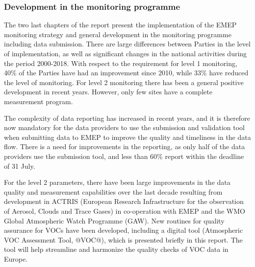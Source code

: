 \subsubsection*{Development in the monitoring programme} 
The two last chapters of the report present the implementation of the EMEP monitoring strategy and general development in the monitoring programme including data submission. There are large differences between Parties in the level of implementation, as well as significant changes in the national activities during the period 2000-2018. With respect to the requirement for level 1 monitoring, 40\% of the Parties have had an improvement since 2010, while 33\% have reduced the level of monitoring. For level 2 monitoring there has been a general positive development in recent years. However, only few sites have a complete measurement program.

The complexity of data reporting has increased in recent years, and it is therefore now mandatory for the data providers to use the submission and validation tool when submitting data to EMEP to improve the quality and timeliness in the data flow. 
There is a need for improvements in the reporting, as only half of the data 
providers use the submission tool, and less than 60\% report within the deadline of 31 July.

For the level 2 parameters, there have been large improvements in the data quality and measurement capabilities over the last decade resulting from development in ACTRIS (European Research Infrastructure for the observation of Aerosol, Clouds and Trace Gases) in co-operation with EMEP and the WMO Global Atmospheric Watch Programme (GAW). New routines for quality assurance for VOCs have been developed, including a digital tool (Atmospheric VOC Assessment Tool, @VOC@), which is presented briefly in this report. The tool will help streamline and harmonize the quality checks of VOC data in Europe.


